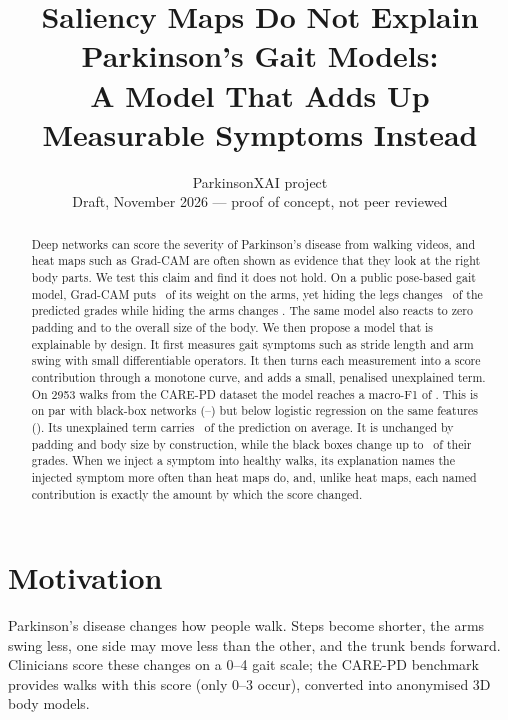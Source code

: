 \documentclass[10pt,twocolumn]{article}
\title{\Large Saliency Maps Do Not Explain Parkinson's Gait Models:\\ A Model That Adds Up Measurable Symptoms Instead}
\author{ParkinsonXAI project \\ \small Draft, November 2026 --- proof of concept, not peer reviewed}
\date{}
\begin{document}
\maketitle

\begin{abstract}
Deep networks can score the severity of Parkinson's disease from walking videos, and heat maps such as
Grad-CAM are often shown as evidence that they look at the right body parts. We test this claim and find it
does not hold. On a public pose-based gait model, Grad-CAM puts \SaboArmShare\ of its weight on the arms,
yet hiding the legs changes \SaboLegChange\ of the predicted grades while hiding the arms changes \SaboArmChange.
The same model also reacts to zero padding and to the overall size of the body. We then propose a model that
is explainable by design. It first measures gait symptoms such as stride length and arm swing with small
differentiable operators. It then turns each measurement into a score contribution through a monotone curve,
and adds a small, penalised unexplained term. On 2953 walks from the CARE-PD dataset the model reaches a
macro-F1 of \PropFone. This is on par with black-box networks (\CNNFoneLo--\STFone) but below logistic regression on
the same features (\LRFone). Its unexplained term carries \Rho\ of the prediction on average. It is unchanged by
padding and body size by construction, while the black boxes change up to \STScale\ of their grades. When we inject a
symptom into healthy walks, its explanation names the injected symptom more often than heat maps do, and, unlike
heat maps, each named contribution is exactly the amount by which the score changed.
\end{abstract}

\section{Motivation}
Parkinson's disease changes how people walk. Steps become shorter, the arms swing less, one side may move less
than the other, and the trunk bends forward. Clinicians score these changes on a 0--4 gait scale; the CARE-PD
benchmark \cite{carepd} provides walks with this score (only 0--3 occur), converted into anonymised 3D body models.
\end{document}

